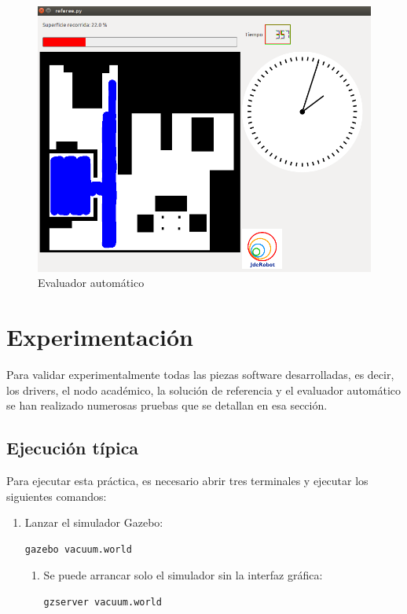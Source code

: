 \begin{figure}[H]
  \begin{center}
    \includegraphics[width=1.0\textwidth]{figures/Vacuum/refereeTiempo.png}
		\caption{Evaluador automático}
		\label{fig.referee}
		\end{center}
\end{figure}



\section{Experimentación} 
Para validar experimentalmente todas las piezas software desarrolladas, es decir, los drivers, el nodo académico, la solución de referencia y el evaluador automático se han realizado numerosas pruebas que se detallan en esa sección.

\subsection{Ejecución típica}
Para ejecutar esta práctica, es necesario abrir tres terminales y ejecutar los siguientes comandos:

\begin{enumerate}[1.]
\item Lanzar el simulador Gazebo:
	\begin{lstlisting}[frame=single]
		gazebo vacuum.world
	\end{lstlisting} 
	\begin{enumerate}[1b.]
	\item Se puede arrancar solo el simulador sin la interfaz gráfica:
		\begin{lstlisting}[frame=single]
		 	gzserver vacuum.world
		\end{lstlisting}
	\end{enumerate}
\end{enumerate}

